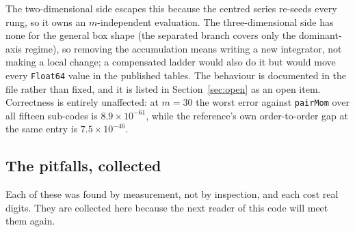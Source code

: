 \documentclass[11pt]{article}
\theoremstyle{remark}
\newcommand{\code}[1]{\texttt{#1}}
\begin{document}
The two-dimensional side escapes this because the centred series re-seeds every rung, so
it owns an $m$-independent evaluation. The three-dimensional side has none for the general
box shape (the separated branch covers only the dominant-axis regime), so removing the
accumulation means writing a new integrator, not making a local change; a compensated
ladder would also do it but would move every \code{Float64} value in the published tables.
The behaviour is documented in the file rather than fixed, and it is listed in
Section~\ref{sec:open} as an open item. Correctness is entirely unaffected: at $m = 30$
the worst error against \code{pairMom} over all fifteen sub-codes is $8.9\times10^{-61}$,
while the reference's own order-to-order gap at the same entry is $7.5\times10^{-46}$.

\subsection{The pitfalls, collected}
\label{sec:pitfalls}

Each of these was found by measurement, not by inspection, and each cost real digits. They
are collected here because the next reader of this code will meet them again.
\end{document}
